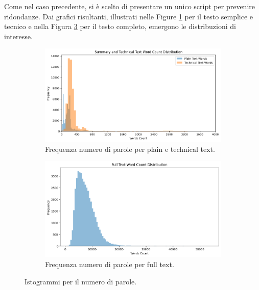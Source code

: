 \documentclass[12pt,a4paper,twoside,openright]{book}
\begin{document}
Come nel caso precedente, si è scelto di presentare un unico script per prevenire ridondanze. Dai grafici risultanti, illustrati nelle Figure \ref{fig:hist_tech_plain_word} per il testo semplice e tecnico e nella Figura \ref{fig:hist_full_word} per il testo completo, emergono le distribuzioni di interesse.

\begin{figure}
    \centering
    \begin{subfigure}[b]{0.89\textwidth}
        \includegraphics[width=\textwidth]{images/sum_tech_wc_distrib.png}
        \caption{Frequenza numero di parole per plain e technical text.}
        \label{fig:hist_tech_plain_word}
    \end{subfigure}
\quad
    \begin{subfigure}[b]{0.85\textwidth}
        \includegraphics[width=\textwidth]{images/full_text_wc_distrib.png}
        \caption{Frequenza numero di parole per full text.}
        \label{fig:hist_full_word}
    \end{subfigure}
    \caption{Istogrammi per il numero di parole.}
\end{figure}
\end{document}
